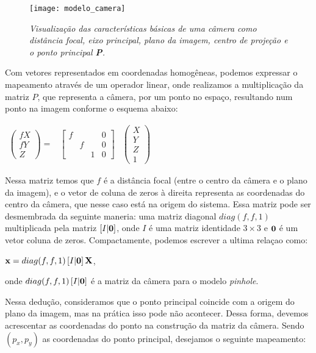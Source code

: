 \begin{figure}[!htb]
\centering
\texttt{[image: modelo\_camera]}
\caption{\textit{Visualização das características básicas de uma câmera como distância focal, eixo principal, plano da imagem, centro de projeção e o ponto principal {\bf P}.}}
\label{camera}
\end{figure}

Com vetores representados em coordenadas homogêneas, podemos expressar o mapeamento através de um operador linear, onde realizamos a multiplicação da matriz $P$, que representa a câmera, por um ponto no espaço, resultando num ponto na imagem conforme o esquema abaixo:

\begin{center}
$
\begin{array}{ccc}
\begin{pmatrix}
fX\\
fY\\
Z
\end{pmatrix} = 
&
\begin{bmatrix}
f& & &0\\
 &f& &0\\
 & &1&0
\end{bmatrix}
&
\begin{pmatrix}
X\\
Y\\
Z\\
1
\end{pmatrix}
\end{array}
$
\end{center}

Nessa matriz temos que $f$ é a distância focal (entre o centro da câmera e o plano da imagem), e o vetor de coluna de zeros à direita representa as coordenadas do centro da câmera, que nesse caso está na origem do sistema. Essa matriz pode ser desmembrada da seguinte maneria: uma matriz diagonal $diag(f,f,1)$ multiplicada pela matriz $[I|{\bf 0}]$, onde $I$ é uma matriz identidade $3\times3$ e ${\bf 0}$ é um vetor coluna de zeros. Compactamente, podemos escrever a ultima relaçao como:

\begin{center}
$\mathbf{x} = diag(f,f,1)\,[I|{\bf 0}]\,\mathbf{X}$,
\end{center}
onde $diag(f,f,1)\,[I|{\bf 0}]$ é a matriz da câmera para o modelo \textit{pinhole}.

Nessa dedução, consideramos que o ponto principal  coincide com a origem do plano da imagem, mas na prática isso pode não acontecer. Dessa forma, devemos acrescentar as coordenadas do ponto na construção da matriz da câmera. Sendo $(p_x,p_y)$ as coordenadas do ponto principal, desejamos o seguinte mapeamento:

